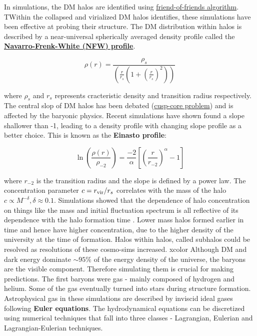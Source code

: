 \documentclass{book}
\begin{document}
In simulations, the DM halos are identified using \href{https://swift.strw.leidenuniv.nl/docs/FriendsOfFriends/algorithm_description.html}{friend-of-friends algorithm}. TWithin the collapsed and virialized DM halos identifies, these simulations have been effective at probing their structure. The DM distribution within halos is described by a near-universal spherically averaged density profile called the \textbf{\href{http://www.astro.yale.edu/vdbosch/jerusalem_lecture3.pdf}{Navarro-Frenk-White (NFW) profile}}. 

\begin{equation}
    \label{eq:NFW}
    \rho(r) = \frac{\rho_s}{\left(\frac{r}{r_s} \left(1 + \left(\frac{r}{r_s} \right)^2 \right)\right)}
\end{equation}

where $\rho_s$ and $r_s$ represents cracteristic density and transition radius respectively. The central slop of DM halos has been debated (\href{https://arxiv.org/pdf/0910.3538}{cusp-core problem}) and is affected by the baryonic physics. Recent simulations have shown found a slope shallower than -1, leading to a density profile with changing slope profile as a better choice. This is known as the \textbf{Einasto profile}:

\begin{equation}
    \label{eq: Einasto}
    \ln{\left(\frac{\rho(r)}{\rho_{-2}}\right)} = \frac{-2}{\alpha} \left[ \left( \frac{r}{r_{-2}} \right)^{\alpha} -1 \right]
\end{equation}

where $r_{-2}$ is the transition radius and the slope is defined by a power law. The concentration parameter $ c = r_{\rm vir}/r_s$ correlates with the mass of the halo $c \propto M^{- \delta}, \delta \approx 0.1$. Simulations showed that the dependence of halo concentration on things like the mass and initial fluctuation spectrum is all reflective of its dependence with the halo formation time \citep{Navarro_1997}. Lower mass halos formed earlier in time and hence have higher concentration, due to the higher density of the university at the time of formation. Halos within halos, called subhalos could be resolved as resolutions of these cosmo-sims increased. 
xcolor
Although DM and dark energy dominate $\sim 95 \%$ of the energy density of the universe, the baryons are the visible component. Therefore simulating them is crucial for making predictions. The first baryons were gas - mainly composed of hydrogen and helium. Some of the gas eventually turned into stars during structure formation. Astrophysical gas in these simulations are described by inviscid ideal gases following \textbf{Euler equations}. The hydrodynamical equations can be discretized using numerical techniques that fall into three classes - Lagrangian, Eulerian and Lagrangian-Eulerian techniques. 
\end{document}
